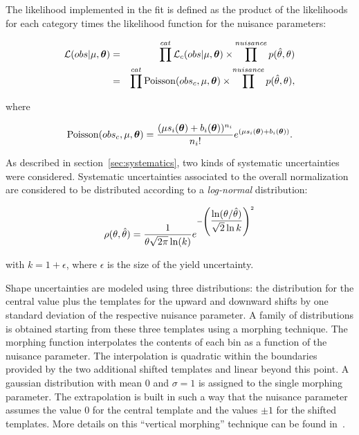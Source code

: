 The likelihood implemented in the fit is defined as the product of the likelihoods for each category times the likelihood function for the nuisance parameters:

\begin{eqnarray}
\mathcal{L}(obs|\mu, \boldsymbol\theta) &=& \prod^{cat} \mathcal{L}_c(obs|\mu, \boldsymbol\theta) \times \prod^{nuisance} p(\hat{\theta},\theta) \nonumber \\
&=& \prod^{cat} \operatorname{Poisson}(obs_c, \mu, \boldsymbol\theta) \times \prod^{nuisance} p(\hat{\theta},\theta),
\end{eqnarray}


where

\begin{equation}
\operatorname{Poisson}(obs_c, \mu, \boldsymbol\theta) = \dfrac{(\mu s_i(\boldsymbol\theta) + b_i(\boldsymbol\theta))^{n_i}}{n_i!}e^{(\mu s_i(\boldsymbol\theta) + b_i(\boldsymbol\theta))}.
\end{equation}

As described in section~\ref{sec:systematics}, two kinds of systematic uncertainties were considered. Systematic uncertainties associated to the overall normalization are considered to be distributed according to a \emph{log-normal} distribution:

\begin{equation}
\rho(\theta, \hat{\theta}) = \dfrac{1}{\theta\sqrt{2\pi}\operatorname{ln}(k)} e^{-\left(\dfrac{\operatorname{ln}(\theta/\hat{\theta})}{\sqrt{2}\operatorname{ln}k}\right)^2}
\end{equation}

with $k = 1+ \epsilon$, where $\epsilon$ is the size of the yield uncertainty.

Shape uncertainties are modeled using three distributions: the distribution for the central value plus the templates for the upward and downward shifts by one standard deviation of the respective nuisance parameter. A family of distributions is obtained starting from these three templates using a morphing technique. The morphing function interpolates the contents of each bin as a function of the nuisance parameter. The interpolation is quadratic within the boundaries provided by the two additional shifted templates and linear beyond this point. A gaussian distribution with mean 0 and $\sigma = 1$ is assigned to the single morphing parameter. The extrapolation is built in such a way that the nuisance parameter assumes the value 0 for the central template and the values $\pm1$ for the shifted templates. More details on this ``vertical morphing'' technique can be found in~\cite{Conway:2011in}.

